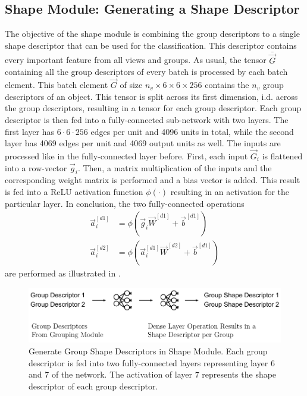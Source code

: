 \subsection{Shape Module: Generating a Shape Descriptor}
\label{sec:architecture-shape-module}
The objective of the shape module is combining the group descriptors to a single shape descriptor that can be used for the classification.
This descriptor contains every important feature from all views and groups.
As usual, the tensor $\bar{\vec{G}}$ containing all the group descriptors of every batch is processed by each batch element.
This batch element $\vec{G}$ of size $n_v \times 6 \times 6 \times 256$ contains the $n_v$ group descriptors of an object.
This tensor is split across its first dimension, i.d. across the group descriptors, resulting in a tensor for each group descriptor.
Each group descriptor is then fed into a fully-connected sub-network with two layers.
The first layer has $6\cdot6\cdot256$ edges per unit and 4096 units in total, while the second layer has 4069 edges per unit and 4069 output units as well.
The inputs are processed like in the fully-connected layer before.
First, each input $\vec{G}_i$ is flattened into a row-vector $\vec{g}_i$.
Then, a matrix multiplication of the inputs and the corresponding weight matrix is performed and a bias vector is added.
This result is fed into a ReLU activation function $\phi(\cdot)$ resulting in an activation for the particular layer.
In conclusion, the two fully-connected operations
\begin{subequations}
	\begin{align}
		\vec{a}^{[d1]}_i &= \phi(\vec{g}_i \vec{W}^{[d1]} + \vec{b}^{[d1]}) \\
		\vec{a}^{[d2]}_i &= \phi(\vec{a}^{[d1]}_i \vec{W}^{[d2]} + \vec{b}^{[d1]})
	\end{align}
\end{subequations}
are performed as illustrated in .
\begin{figure}
	\centering
	\includegraphics[]{images/shape_module_group_shape.pdf}
	\caption[Generate Group Shape Descriptors in Shape Module]{Generate Group Shape Descriptors in Shape Module. Each group descriptor is fed into two fully-connected layers representing layer 6 and 7 of the network. The activation of layer 7 represents the shape descriptor of each group descriptor.}
	\label{fig:shape-module-group-shape}
\end{figure}
